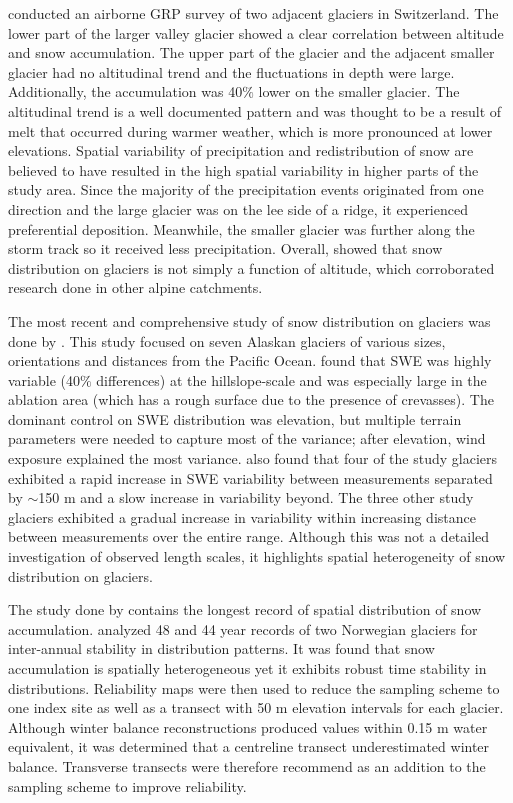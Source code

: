 \documentclass{sfuthesis}
\begin{document}
\cite{Machguth2006} conducted an airborne GRP survey of two adjacent glaciers in Switzerland. The lower part of the larger valley glacier showed a clear correlation between altitude and snow accumulation. The upper part of the glacier and the adjacent smaller glacier had no altitudinal trend and the fluctuations in depth were large. Additionally, the accumulation was 40$\%$ lower on the smaller glacier. The altitudinal trend is a well documented pattern and was thought to be a result of melt that occurred during warmer weather, which is more pronounced at lower elevations. Spatial variability of precipitation and redistribution of snow are believed to have resulted in the high spatial variability in higher parts of the study area. Since the majority of the precipitation events originated from one direction and the large glacier was on the lee side of a ridge, it experienced preferential deposition. Meanwhile, the smaller glacier was further along the storm track so it received less precipitation. Overall, \cite{Machguth2006} showed that snow distribution on glaciers is not simply a function of altitude, which corroborated research done in other alpine catchments.

The most recent and comprehensive study of snow distribution on glaciers was done by \cite{McGrath2015}. This study focused on seven Alaskan glaciers of various sizes, orientations and distances from the Pacific Ocean. \cite{McGrath2015} found that SWE was highly variable (40$\%$ differences) at the hillslope-scale and was especially large in the ablation area (which has a rough surface due to the presence of crevasses). The dominant control on SWE distribution was elevation, but multiple terrain parameters were needed to capture most of the variance; after elevation, wind exposure explained the most variance. \cite{McGrath2015} also found that four of the study glaciers exhibited a rapid increase in SWE variability between measurements separated by $\sim$150 m and a slow increase in variability beyond. The three other study glaciers exhibited a gradual increase in variability within increasing distance between measurements over the entire range. Although this was not a detailed investigation of observed length scales, it highlights spatial heterogeneity of snow distribution on glaciers.

The study done by \cite{Walmsley2015} contains the longest record of spatial distribution of snow accumulation. \cite{Walmsley2015} analyzed 48 and 44 year records of two Norwegian glaciers for inter-annual stability in distribution patterns. It was found that snow accumulation is spatially heterogeneous yet it exhibits robust time stability in distributions. Reliability maps were then used to reduce the sampling scheme to one index site as well as a transect with 50 m elevation intervals for each glacier. Although winter balance reconstructions produced values within 0.15 m water equivalent, it was determined that a centreline transect underestimated winter balance. Transverse transects were therefore recommend as an addition to the sampling scheme to improve reliability.
\end{document}
